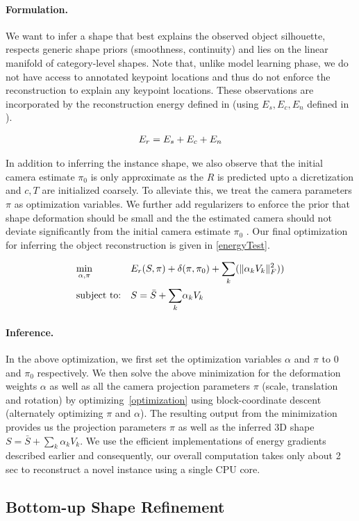 \paragraph{Formulation.}
We want to infer a shape that best explains the observed object silhouette, respects generic shape priors (smoothness, continuity) and lies on the linear manifold of category-level shapes. Note that, unlike model learning phase, we do not have access to annotated keypoint locations and thus do not enforce the reconstruction to explain any keypoint locations. These observations are incorporated by the reconstruction energy defined in  (using $E_{s},E_{c},E_{n}$ defined in ).

\begin{gather}
 \eqlabel{testRecon}E_{r} = E_{s} + E_{c} + E_{n}
\end{gather}

In addition to inferring the instance shape, we also observe that the initial camera estimate $\pi_0$ is only approximate as the $R$ is predicted upto a dicretization and $c,T$ are initialized coarsely. To alleviate this, we treat the camera parameters $\pi$ as optimization variables.  We further add regularizers to enforce the prior that shape deformation should be small and the the estimated camera should not deviate significantly from the initial camera estimate $\pi_0$ . Our final optimization for inferring the object reconstruction is given in \eqref{energyTest}.

\begin{equation}
\begin{aligned}
\eqlabel{energyTest}
& \underset{\alpha,\pi}{\text{min}}
& & E_{r}(S,\pi) + \delta(\pi,\pi_0) +\underset{k}{\sum}(\|\alpha_{k}V_k\|_F^{2})) \\
& \text{subject to:}
& & S = \bar{S} + \underset{k}{\sum}\alpha_{k} V_k
\end{aligned}
\end{equation}

\paragraph{Inference.} In the above optimization,  we first set the optimization variables $\alpha$ and $\pi$ to $0$ and $\pi_0$ respectively.  We then solve the above minimization for the deformation weights $\alpha$ as well as all the camera projection parameters $\pi$ (scale, translation and rotation) by optimizing~\eqref{optimization}  using block-coordinate descent (alternately optimizing $\pi$ and $\alpha$). The resulting output from the minimization provides us the projection parameters $\pi$ as well as the inferred 3D shape $S = \bar{S} + {\sum_k}\alpha_{k} V_k$. We use the efficient implementations of energy gradients described earlier and consequently, our overall computation takes only about 2 sec to reconstruct a novel instance using a single CPU core.


\subsection{Bottom-up Shape Refinement}

